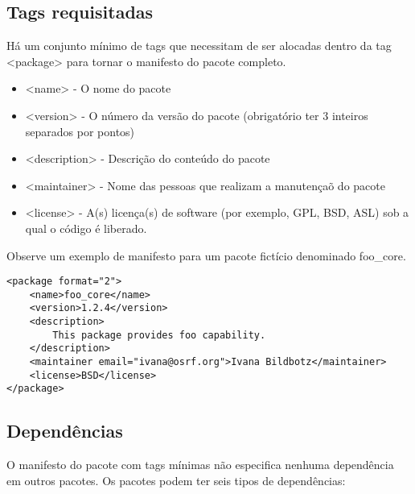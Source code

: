 \subsection{Tags requisitadas}

Há um conjunto mínimo de tags que necessitam de ser alocadas dentro da tag <package> para tornar o manifesto do pacote completo.

\begin{itemize}
	\setlength{\itemsep}{1pt}
	\setlength{\parskip}{0pt}
	\setlength{\parsep}{0pt}
	\item[] <name> - O nome do pacote
	\item[] <version> - O número da versão do pacote (obrigatório ter 3 inteiros separados por pontos)
	\item[] <description> - Descrição do conteúdo do pacote
	\item[] <maintainer> - Nome das pessoas que realizam a manutençaõ do pacote
	\item[] <license> - A(s) licença(s) de software (por exemplo, GPL, BSD, ASL) sob a qual o código é liberado.
\end{itemize}


Observe um exemplo de manifesto para um pacote fictício denominado foo\_core.

\begin{verbatim}
<package format="2">
	<name>foo_core</name>
	<version>1.2.4</version>
	<description>
		This package provides foo capability.
	</description>
	<maintainer email="ivana@osrf.org">Ivana Bildbotz</maintainer>
	<license>BSD</license>
</package>
\end{verbatim}

\subsection{Dependências}

O manifesto do pacote com tags mínimas não especifica nenhuma dependência em outros pacotes. Os pacotes podem ter seis tipos de dependências:

